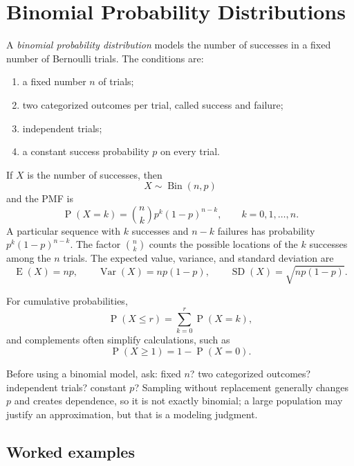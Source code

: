 \documentclass[11pt]{article}
\newcommand{\Pp}{\operatorname{P}}
\newcommand{\E}{\operatorname{E}}
\newcommand{\Var}{\operatorname{Var}}
\newcommand{\SD}{\operatorname{SD}}
\newcommand{\Bin}{\operatorname{Bin}}
\begin{document}
\section{Binomial Probability Distributions}\label{sec:binomial}
A \emph{binomial probability distribution} models the number of successes in a
fixed number of Bernoulli trials.  The conditions are:
\begin{enumerate}
\item a fixed number $n$ of trials;
\item two categorized outcomes per trial, called success and failure;
\item independent trials;
\item a constant success probability $p$ on every trial.
\end{enumerate}
If $X$ is the number of successes, then
\[
X\sim\Bin(n,p)
\]
and the PMF is
\[
\Pp(X=k)=\binom{n}{k}p^k(1-p)^{n-k},\qquad k=0,1,\ldots,n.
\]
A particular sequence with $k$ successes and $n-k$ failures has probability
$p^k(1-p)^{n-k}$.  The factor $\binom{n}{k}$ counts the possible locations of
the $k$ successes among the $n$ trials.  The expected value, variance, and
standard deviation are
\[
\E(X)=np,
\qquad
\Var(X)=np(1-p),
\qquad
\SD(X)=\sqrt{np(1-p)}.
\]

For cumulative probabilities,
\[
\Pp(X\leq r)=\sum_{k=0}^{r}\Pp(X=k),
\]
and complements often simplify calculations, such as
\[
\Pp(X\geq1)=1-\Pp(X=0).
\]

\begin{keybox}
Before using a binomial model, ask: fixed $n$? two categorized outcomes?
independent trials? constant $p$?  Sampling without replacement generally
changes $p$ and creates dependence, so it is not exactly binomial; a large
population may justify an approximation, but that is a modeling judgment.
\end{keybox}

\subsection{Worked examples}
\end{document}
